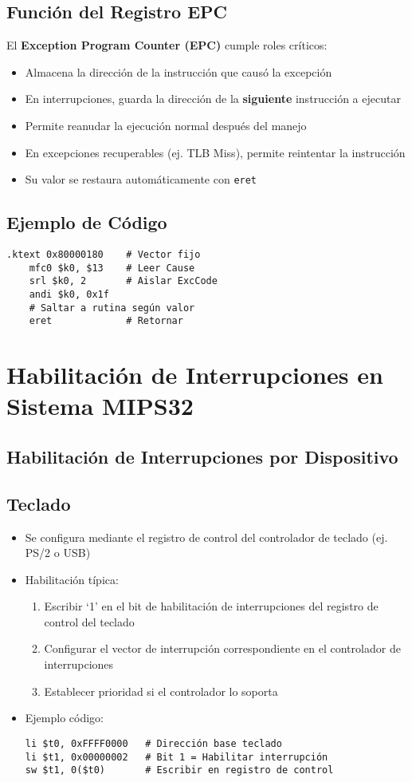 \documentclass{article}
\begin{document}
\subsection{Función del Registro EPC}
El \textbf{Exception Program Counter (EPC)} cumple roles críticos:
\begin{itemize}
    \item Almacena la dirección de la instrucción que causó la excepción
    \item En interrupciones, guarda la dirección de la \textbf{siguiente} instrucción a ejecutar
    \item Permite reanudar la ejecución normal después del manejo
    \item En excepciones recuperables (ej. TLB Miss), permite reintentar la instrucción
    \item Su valor se restaura automáticamente con \texttt{eret}
\end{itemize}

\subsection{Ejemplo de Código}
\begin{verbatim}
.ktext 0x80000180    # Vector fijo
    mfc0 $k0, $13    # Leer Cause
    srl $k0, 2       # Aislar ExcCode
    andi $k0, 0x1f
    # Saltar a rutina según valor
    eret             # Retornar
\end{verbatim}
\section{Habilitación de Interrupciones en Sistema MIPS32}
\subsection{Habilitación de Interrupciones por Dispositivo}

\subsection{Teclado}
\begin{itemize}
\item Se configura mediante el registro de control del controlador de teclado (ej. PS/2 o USB)
\item Habilitación típica:
  \begin{enumerate}
  \item Escribir `1' en el bit de habilitación de interrupciones del registro de control del teclado
  \item Configurar el vector de interrupción correspondiente en el controlador de interrupciones
  \item Establecer prioridad si el controlador lo soporta
  \end{enumerate}
\item Ejemplo código:
\begin{verbatim}
li $t0, 0xFFFF0000   # Dirección base teclado
li $t1, 0x00000002   # Bit 1 = Habilitar interrupción
sw $t1, 0($t0)       # Escribir en registro de control
\end{verbatim}
\end{itemize}
\end{document}
